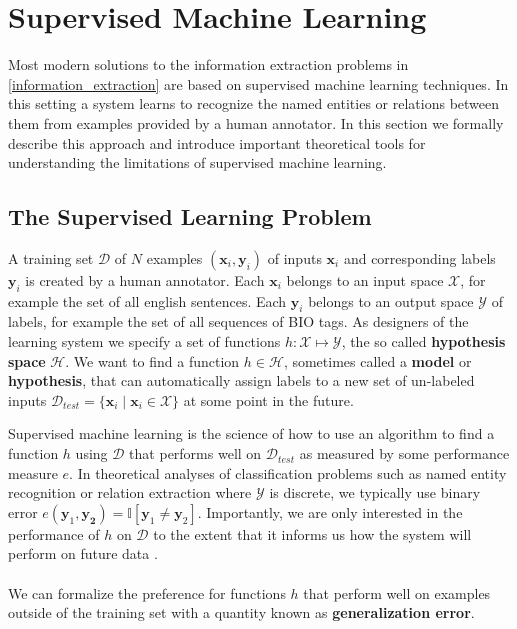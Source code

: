 \section{Supervised Machine Learning}
\label{supervised_machine_learning}

Most modern solutions to the information extraction problems in \ref{information_extraction} are based on supervised machine learning techniques. In this setting a system learns to recognize the named entities or relations between them from examples provided by a human annotator. In this section we formally describe this approach and introduce important theoretical tools for understanding the limitations of supervised machine learning.

\subsection{The Supervised Learning Problem}
\label{the_supervised_learning_problem}
A training set $\mathcal{D}$ of $N$ examples $(\mathbf{x}_i, \mathbf{y}_i)$ of inputs $\mathbf{x}_i$ and corresponding labels $\mathbf{y}_i$ is created by a human annotator. Each $\mathbf{x}_i$ belongs to an input space $\mathcal{X}$, for example the set of all english sentences. Each $\mathbf{y}_i$ belongs to an output space $\mathcal{Y}$ of labels, for example the set of all sequences of BIO tags. As designers of the learning system we specify a set of functions $h: \mathcal{X} \mapsto \mathcal{Y}$, the so called \textbf{hypothesis space} $\mathcal{H}$. We want to find a function $h \in \mathcal{H}$, sometimes called a \textbf{model} or \textbf{hypothesis}, that can automatically assign labels to a new set of un-labeled inputs $\mathcal{D}_{test} = \{ \mathbf{x}_i \mid \mathbf{x}_i \in \mathcal{X}\}$ at some point in the future. 

Supervised machine learning is the science of how to use an algorithm to find a function $h$ using $\mathcal{D}$ that performs well on $\mathcal{D}_{test}$ as measured by some performance measure $e$. In theoretical analyses of classification problems such as named entity recognition or relation extraction where $\mathcal{Y}$ is discrete, we typically use binary error $e(\mathbf{y}_1, \mathbf{y_2}) = \mathbb{I}[\mathbf{y}_1 \neq \mathbf{y}_2]$. Importantly, we are only interested in the performance of $h$ on $\mathcal{D}$ to the extent that it informs us how the system will perform on future data \citep{yaser12}.
\\\\
We can formalize the preference for functions $h$ that perform well on examples outside of the training set with a quantity known as \textbf{generalization error}.

